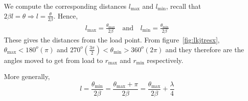 We compute the corresponding distances $l_\max$ and $l_\min$, 
recall that $2\beta{l} = \theta\Longrightarrow l =\frac{\theta}{2\beta}$. Hence,
\begin{align*}
l_\max = \frac{\theta_\max}{2\beta}\quad\text{and}\quad l_\min = \frac{\theta_\min}{2\beta}
\end{align*}
These gives the distances from the load point. From figure~\ref{fig:lkjtresx}, $\theta_\max < 180^o(\pi)$ and $270^o(\frac{3\pi}{2}) <\theta_\min >360^o(2\pi)$ and they therefore are the angles moved to get from load to $r_\max$ and $r_\min$ respectively.

More generally,
\begin{dmath}
l = \frac{\theta_\min}{2\beta}
=\frac{\theta_\max + \pi}{2\beta} 
= \frac{\theta_\max}{2\beta} + \frac{\lambda}{4}
\end{dmath}